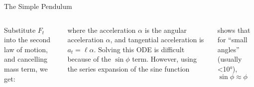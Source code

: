 \documentclass[12pt,compress,aspectratio=169]{beamer}
\begin{document}
\begin{frame}{The Simple Pendulum}
  \begin{columns}
    Substitute $F_t$ into the second law of motion, and cancelling mass term,
    we get:


    \vspace{-.1in}where the acceleration $\alpha$ is the angular acceleration
    $\alpha$, and tangential acceleration is $a_t=\ell\alpha$. Solving this ODE
    is difficult because of the $\sin\phi$ term. However, using the series
    expansion of the sine function

    
    shows that for ``small angles'' (usually <\ang{10}), $\sin\phi\approx\phi$
    
  \end{columns}
\end{frame}
\end{document}
